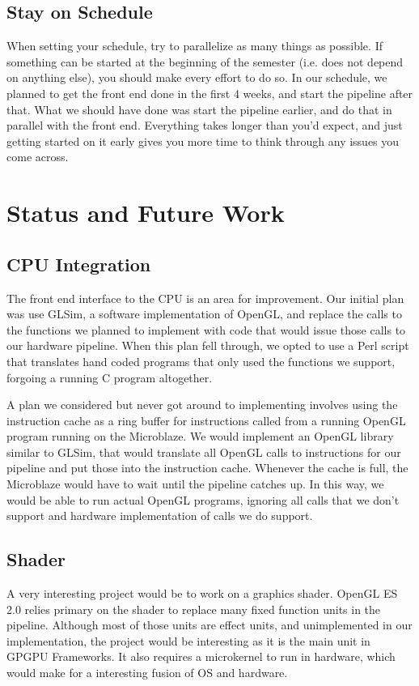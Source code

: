 \documentclass[letterpaper,10pt]{article}
\begin{document}
\subsection{Stay on Schedule}
When setting your schedule, try to parallelize as many things as possible. If something can be started at the beginning of the semester (i.e. does not depend on anything else), you should make every effort to do so. In our schedule, we planned to get the front end done in the first 4 weeks, and start the pipeline after that. What we should have done was start the pipeline earlier, and do that in parallel with the front end. Everything takes longer than you'd expect, and just getting started on it early gives you more time to think through any issues you come across.

\section{Status and Future Work}

\subsection{CPU Integration}
The front end interface to the CPU is an area for improvement. Our initial plan was use GLSim, a software implementation of OpenGL, and replace the calls to the functions we planned to implement with code that would issue those calls to our hardware pipeline. When this plan fell through, we opted to use a Perl script that translates hand coded programs that only used the functions we support, forgoing a running C program altogether.

A plan we considered but never got around to implementing involves using the instruction cache as a ring buffer for instructions called from a running OpenGL program running on the Microblaze. We would implement an OpenGL library similar to GLSim, that would translate all OpenGL calls to instructions for our pipeline and put those into the instruction cache. Whenever the cache is full, the Microblaze would have to wait until the pipeline catches up. In this way, we would be able to run actual OpenGL programs, ignoring all calls that we don't support and hardware implementation of calls we do support.

\subsection{Shader}
A very interesting project would be to work on a graphics shader.  OpenGL ES 2.0 relies primary on the shader to replace many fixed function units in the pipeline.  Although most of those units are effect units, and unimplemented in our implementation, the project would be interesting as it is the main unit in GPGPU Frameworks.  It also requires a microkernel to run in hardware, which would make for a interesting fusion of OS and hardware.
\end{document}
